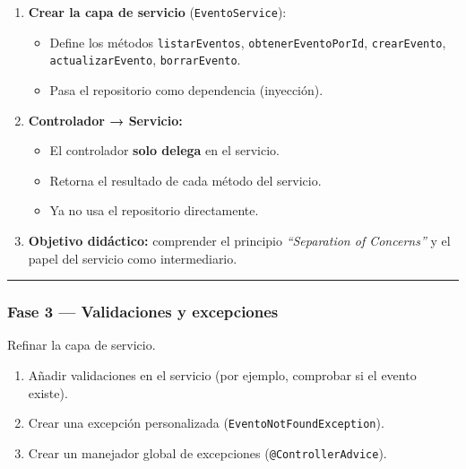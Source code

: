 \documentclass[
]{article}
\providecommand{\tightlist}{%
  \setlength{\itemsep}{0pt}\setlength{\parskip}{0pt}}
\begin{document}
\begin{enumerate}
\def\labelenumi{\arabic{enumi}.}
\item
  \textbf{Crear la capa de servicio} (\texttt{EventoService}):

  \begin{itemize}
  \tightlist
  \item
    Define los métodos \texttt{listarEventos},
    \texttt{obtenerEventoPorId}, \texttt{crearEvento},
    \texttt{actualizarEvento}, \texttt{borrarEvento}.
  \item
    Pasa el repositorio como dependencia (inyección).
  \end{itemize}
\item
  \textbf{Controlador → Servicio:}

  \begin{itemize}
  \tightlist
  \item
    El controlador \textbf{solo delega} en el servicio.
  \item
    Retorna el resultado de cada método del servicio.
  \item
    Ya no usa el repositorio directamente.
  \end{itemize}
\item
  \textbf{Objetivo didáctico:} comprender el principio
  \emph{``Separation of Concerns''} y el papel del servicio como
  intermediario.
\end{enumerate}

\begin{center}\rule{0.5\linewidth}{0.5pt}\end{center}

\subsubsection{\texorpdfstring{\textbf{Fase 3 --- Validaciones y
excepciones}}{Fase 3 --- Validaciones y excepciones}}\label{fase-3-validaciones-y-excepciones}

Refinar la capa de servicio.

\begin{enumerate}
\def\labelenumi{\arabic{enumi}.}
\tightlist
\item
  Añadir validaciones en el servicio (por ejemplo, comprobar si el
  evento existe).
\item
  Crear una excepción personalizada (\texttt{EventoNotFoundException}).
\item
  Crear un manejador global de excepciones (\texttt{@ControllerAdvice}).
\end{enumerate}
\end{document}
